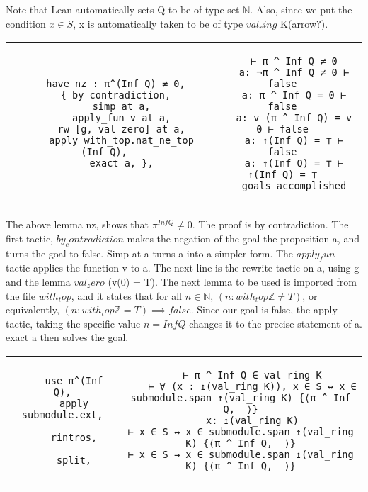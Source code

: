 \documentclass[10pt, a4paper]{article}
\begin{document}
Note that Lean automatically sets Q to be of type set $\mathbb{N}$. Also, since we put the condition $x \in S$, x is automatically taken to be of type $val_ring$ K(arrow?). \\

\begin{tabular}{c|c}
    \begin{lstlisting}
    have nz : π^(Inf Q) ≠ 0,
    { by_contradiction,
      simp at a,
      apply_fun v at a,
      rw [g, val_zero] at a,
      apply with_top.nat_ne_top (Inf Q),
      exact a, },
    \end{lstlisting} & 
    \begin{lstlisting}
    ⊢ π ^ Inf Q ≠ 0
    a: ¬π ^ Inf Q ≠ 0 ⊢ false
    a: π ^ Inf Q = 0 ⊢ false
    a: v (π ^ Inf Q) = v 0 ⊢ false
    a: ↑(Inf Q) = ⊤ ⊢ false
    a: ↑(Inf Q) = ⊤ ⊢ ↑(Inf Q) = ⊤
    goals accomplished
    \end{lstlisting} 
\end{tabular}

The above lemma nz, shows that $\pi^{Inf Q} \neq 0$. The proof is by contradiction. The first tactic, $by_contradiction$ makes the negation of the goal the proposition a, and turns the goal to false. Simp at a turns a into a simpler form. The $apply_fun$ tactic applies the function v to a. The next line is the rewrite tactic on a, using g and the lemma $val_zero$ (v(0) = T). The next lemma to be used is imported from the file $with_top$, and it states that for all $n \in \mathbb{N}$, $(n : with_top \mathbb{Z} \neq T)$, or equivalently, $(n : with_top \mathbb{Z} = T) \implies false$. Since our goal is false, the apply tactic, taking the specific value $n=Inf Q$ changes it to the precise statement of a. exact a then solves the goal. \\

\begin{tabular}{c|c}
    \begin{lstlisting}
    use π^(Inf Q),
    apply submodule.ext,
    
    rintros,
    
    split,
    \end{lstlisting} &
    \begin{lstlisting}
    ⊢ π ^ Inf Q ∈ val_ring K
    ⊢ ∀ (x : ↥(val_ring K)), x ∈ S ↔ x ∈ submodule.span ↥(val_ring K) {⟨π ^ Inf Q, _⟩}
    x: ↥(val_ring K)
⊢ x ∈ S ↔ x ∈ submodule.span ↥(val_ring K) {⟨π ^ Inf Q, _⟩}
⊢ x ∈ S → x ∈ submodule.span ↥(val_ring K) {⟨π ^ Inf Q, _⟩}
    \end{lstlisting}
\end{tabular}
\end{document}
